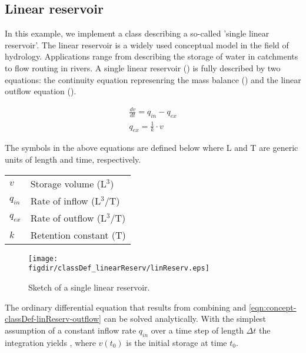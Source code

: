 \subsection{Linear reservoir} \label{sec:concept-classDef-linReserv}

In this example, we implement a class describing a so-called 'single linear reservoir'. The linear reservoir is a widely used conceptual model in the field of hydrology. Applications range from describing the storage of water in catchments to flow routing in rivers. A single linear reservoir () is fully described by two equations: the continuity equation represenring the mass balance () and the linear outflow equation ().

\begin{align}
  \frac{dv}{dt} = q_{in} - q_{ex} \label{eqn:concept-classDef-linReserv-continuity} \\
  q_{ex} = \frac{1}{k} \cdot v \label{eqn:concept-classDef-linReserv-outflow}
\end{align}

The symbols in the above equations are defined below where L and T are generic units of length and time, respectively.

\begin{tabular}{ll}
  $v$ &      Storage volume (L$^3$) \\
  $q_{in}$ & Rate of inflow (L$^3$/T) \\
  $q_{ex}$ & Rate of outflow (L$^3$/T) \\
  $k$ &      Retention constant (T) \\
\end{tabular}

\begin{figure}[h!bt]
  \centering
  \texttt{[image: \\figdir/classDef\_linearReserv/linReserv.eps]}
  \caption{Sketch of a single linear reservoir. \label{eqn:concept-classDef-linReserv-sketch}}
\end{figure}

The ordinary differential equation that results from combining  and \ref{eqn:concept-classDef-linReserv-outflow} can be solved analytically. With the simplest assumption of a constant inflow rate $q_{in}$ over a time step of length $\Delta t$ the integration yields , where $v(t_0)$ is the initial storage at time $t_0$.

